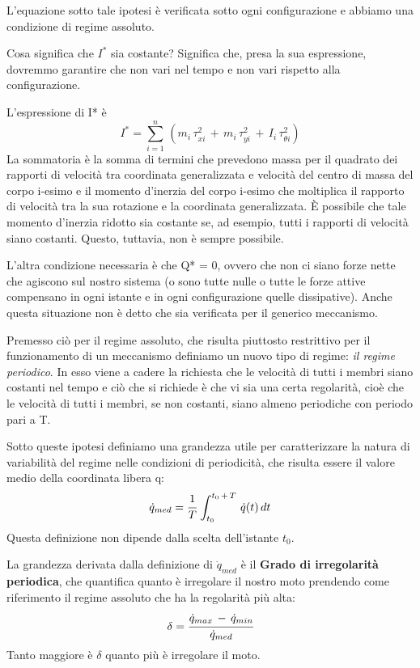 L'equazione sotto tale ipotesi è verificata sotto ogni configurazione e abbiamo una condizione di regime assoluto.

Cosa significa che $I^*$ sia costante? Significa che, presa la sua espressione, dovremmo garantire che non vari nel tempo e non vari rispetto alla configurazione.

L'espressione di I* è
\[I^* = \sum_{i=1}^n\,(m_i\,\tau_{xi}^2\,+\,m_i\,\tau_{yi}^2\,+\,I_i\,\tau_{\theta i}^2)\]
La sommatoria è la somma di termini che prevedono massa per il quadrato dei rapporti di velocità tra coordinata generalizzata e velocità del centro di massa del corpo i-esimo e il momento d'inerzia del corpo i-esimo che moltiplica il rapporto di velocità tra la sua rotazione e la coordinata generalizzata. È possibile che tale momento d'inerzia ridotto sia costante se, ad esempio, tutti i rapporti di velocità siano costanti. Questo, tuttavia, non è sempre possibile.\newline

L'altra condizione necessaria è che Q* = 0, ovvero che non ci siano forze nette che agiscono sul nostro sistema (o sono tutte nulle o tutte le forze attive compensano in ogni istante e in ogni configurazione quelle dissipative). Anche questa situazione non è detto che sia verificata per il generico meccanismo.\newline

Premesso ciò per il regime assoluto, che risulta piuttosto restrittivo per il funzionamento di un meccanismo definiamo un nuovo tipo di regime: \emph{il regime periodico}. In esso viene a cadere la richiesta che le velocità di tutti i membri siano costanti nel tempo e ciò che si richiede è che vi sia una certa regolarità, cioè che le velocità di tutti i membri, se non costanti, siano almeno periodiche con periodo pari a T.

Sotto queste ipotesi definiamo una grandezza utile per caratterizzare la natura di variabilità del regime nelle condizioni di periodicità, che risulta essere il valore medio della coordinata libera q:
\[\dot{q}_{med} = \cfrac{1}{T}\,\int_{t_0}^{t_0\,+\,T}\,\dot{q}(t)\,dt\]
Questa definizione non dipende dalla scelta dell'istante $t_0$.

La grandezza derivata dalla definizione di $\dot{q}_{med}$ è il \textbf{Grado di irregolarità periodica}, che quantifica quanto è irregolare il nostro moto prendendo come riferimento il regime assoluto che ha la regolarità più alta:
\[\delta = \cfrac{\dot{q}_{max}\,-\,\dot{q}_{min}}{\dot{q}_{med}}\]
 Tanto maggiore è $\delta$ quanto più è irregolare il moto.
 
